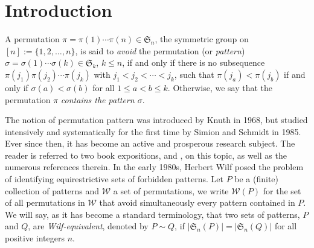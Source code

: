 \documentclass[12pt]{amsart}
\numberwithin{equation}{section}
\theoremstyle{plain}
\theoremstyle{definition}
\def\S{\mathfrak{S}}
\begin{document}

\maketitle





\section{Introduction}\label{sec1: intro}


A permutation $\pi=\pi(1)\cdots\pi(n)\in\S_n$, the symmetric group on $[n]:=\{1,2,\ldots,n\}$, is said to {\em avoid} the permutation (or {\em pattern}) $\sigma=\sigma(1)\cdots \sigma(k)\in\S_k$, $k\le n$, if and only if there is no subsequence $\pi(j_1)\pi(j_2)\cdots\pi(j_k)$ with $j_1<j_2<\cdots<j_k$, such that $\pi(j_a)<\pi(j_b)$ if and only if $\sigma(a)<\sigma(b)$ for all $1\le a<b\le k$. Otherwise, we say that the permutation $\pi$ {\em contains the pattern $\sigma$}. 

The notion of permutation pattern was introduced by Knuth \cite[pp.~242-243]{knu} in 1968, but studied intensively and systematically for the first time by Simion and Schmidt \cite{SS} in 1985. Ever since then, it has become an active and prosperous research subject. The reader is referred to two book expositions, \cite[Chapters 4 and 5]{bon} and \cite{kit}, on this topic, as well as the numerous references therein. In the early 1980s, Herbert Wilf posed the problem of identifying equirestrictive sets of forbidden patterns. Let $P$ be a (finite) collection of patterns and $\mathcal{W}$ a set of permutations, we write $\mathcal{W}(P)$ for the set of all permutations in $\mathcal{W}$ that avoid simultaneously every pattern contained in $P$. We will say, as it has become a standard terminology, that two sets of patterns, $P$ and $Q$, are {\em Wilf-equivalent}, denoted by $P\sim Q$, if $|\S_n(P)|=|\S_n(Q)|$ for all positive integers $n$. 
\end{document}
